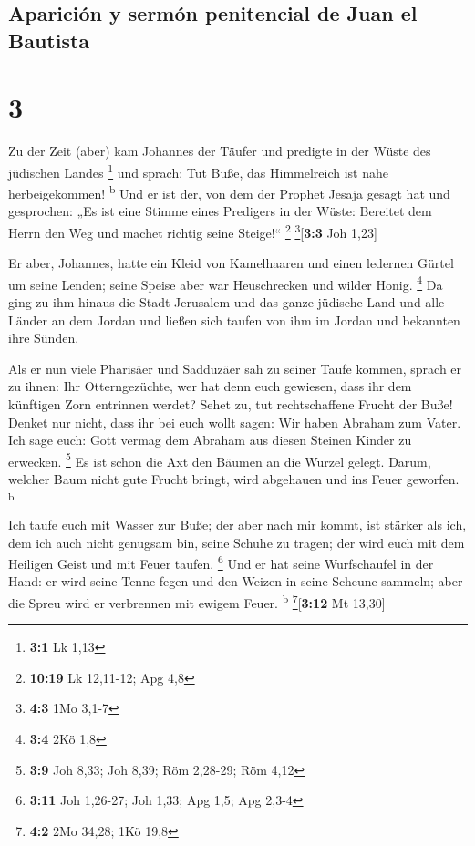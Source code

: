 \hypertarget{apariciuxf3n-y-sermuxf3n-penitencial-de-juan-el-bautista}{%
\subsection{Aparición y sermón penitencial de Juan el
Bautista}\label{apariciuxf3n-y-sermuxf3n-penitencial-de-juan-el-bautista}}

\hypertarget{section-2}{%
\section{3}\label{section-2}}

 Zu der Zeit (aber) kam Johannes der Täufer und predigte
in der Wüste des jüdischen Landes \footnote{\textbf{3:1} Lk 1,13}
 und sprach: Tut Buße, das Himmelreich ist nahe
herbeigekommen! \textsuperscript{b}  Und er ist der, von
dem der Prophet Jesaja gesagt hat und gesprochen: „Es ist eine Stimme
eines Predigers in der Wüste: Bereitet dem Herrn den Weg und machet
richtig seine Steige!{}`` \footnote{\textbf{10:19} Lk 12,11-12; Apg 4,8}
\footnote{\textbf{4:3} 1Mo 3,1-7}{[}\textbf{3:3} Joh 1,23{]}

 Er aber, Johannes, hatte ein Kleid von Kamelhaaren und
einen ledernen Gürtel um seine Lenden; seine Speise aber war
Heuschrecken und wilder Honig. \footnote{\textbf{3:4} 2Kö 1,8}
 Da ging zu ihm hinaus die Stadt Jerusalem und das ganze
jüdische Land und alle Länder an dem Jordan  und ließen
sich taufen von ihm im Jordan und bekannten ihre Sünden.

 Als er nun viele Pharisäer und Sadduzäer sah zu seiner
Taufe kommen, sprach er zu ihnen: Ihr Otterngezüchte, wer hat denn euch
gewiesen, dass ihr dem künftigen Zorn entrinnen werdet? 
Sehet zu, tut rechtschaffene Frucht der Buße!  Denket nur
nicht, dass ihr bei euch wollt sagen: Wir haben Abraham zum Vater. Ich
sage euch: Gott vermag dem Abraham aus diesen Steinen Kinder zu
erwecken. \footnote{\textbf{3:9} Joh 8,33; Joh 8,39; Röm 2,28-29; Röm
  4,12}  Es ist schon die Axt den Bäumen an die Wurzel
gelegt. Darum, welcher Baum nicht gute Frucht bringt, wird abgehauen und
ins Feuer geworfen. \textsuperscript{b}

 Ich taufe euch mit Wasser zur Buße; der aber nach mir
kommt, ist stärker als ich, dem ich auch nicht genugsam bin, seine
Schuhe zu tragen; der wird euch mit dem Heiligen Geist und mit Feuer
taufen. \footnote{\textbf{3:11} Joh 1,26-27; Joh 1,33; Apg 1,5; Apg
  2,3-4}  Und er hat seine Wurfschaufel in der Hand: er
wird seine Tenne fegen und den Weizen in seine Scheune sammeln; aber die
Spreu wird er verbrennen mit ewigem Feuer. \textsuperscript{b}
\footnote{\textbf{4:2} 2Mo 34,28; 1Kö 19,8}{[}\textbf{3:12} Mt 13,30{]}

